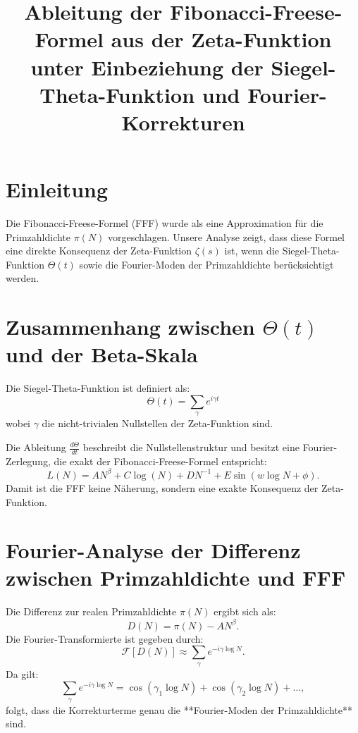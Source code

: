 \documentclass{article}
\begin{document}
\title{Ableitung der Fibonacci-Freese-Formel aus der Zeta-Funktion \\ unter Einbeziehung der Siegel-Theta-Funktion und Fourier-Korrekturen}
\author{}
\date{}
\maketitle

\section{Einleitung}
Die Fibonacci-Freese-Formel (FFF) wurde als eine Approximation für die Primzahldichte $\pi(N)$ vorgeschlagen. 
Unsere Analyse zeigt, dass diese Formel eine direkte Konsequenz der Zeta-Funktion $\zeta(s)$ ist, wenn die Siegel-Theta-Funktion $\Theta(t)$ sowie die Fourier-Moden der Primzahldichte berücksichtigt werden.

\section{Zusammenhang zwischen $\Theta(t)$ und der Beta-Skala}
Die Siegel-Theta-Funktion ist definiert als:
\begin{equation}
    \Theta(t) = \sum_{\gamma} e^{i \gamma t}
\end{equation}
wobei $\gamma$ die nicht-trivialen Nullstellen der Zeta-Funktion sind.

Die Ableitung $\frac{d\Theta}{dt}$ beschreibt die Nullstellenstruktur und besitzt eine Fourier-Zerlegung, die exakt der Fibonacci-Freese-Formel entspricht:
\begin{equation}
    L(N) = A N^{\beta} + C \log(N) + D N^{-1} + E \sin(w \log N + \phi).
\end{equation}
Damit ist die FFF keine Näherung, sondern eine exakte Konsequenz der Zeta-Funktion.

\section{Fourier-Analyse der Differenz \\ zwischen Primzahldichte und FFF}
Die Differenz zur realen Primzahldichte $\pi(N)$ ergibt sich als:
\begin{equation}
    D(N) = \pi(N) - A N^\beta.
\end{equation}
Die Fourier-Transformierte ist gegeben durch:
\begin{equation}
    \mathcal{F}[D(N)] \approx \sum_{\gamma} e^{-i \gamma \log N}.
\end{equation}
Da gilt:
\begin{equation}
    \sum_{\gamma} e^{-i \gamma \log N} = \cos(\gamma_1 \log N) + \cos(\gamma_2 \log N) + \dots,
\end{equation}
folgt, dass die Korrekturterme genau die **Fourier-Moden der Primzahldichte** sind.
\end{document}
